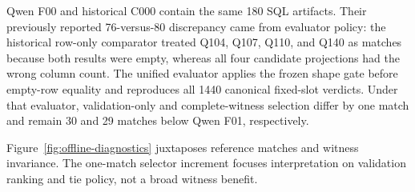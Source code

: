 \documentclass[information,article,submit,moreauthors]{Definitions/mdpi}
\begin{document}
\begin{table}[htbp]
\caption{Descriptive unified-evaluator comparison for the historical eight-slot pool. Differences and paired rescue/harm use C000 as baseline. C000 and Qwen F00 contain identical normalized SQL. All 180 questions are retained; no population or cross-template inference is attached to these counts. Historical question-level intervals and tests are preserved in Appendix~\ref{sec:historical-question-statistics}.}
\label{tab:offline}
\centering
\scriptsize
{}
\end{table}

Qwen F00 and historical C000 contain the same 180 SQL artifacts. Their previously reported 76-versus-80 discrepancy came from evaluator policy: the historical row-only comparator treated Q104, Q107, Q110, and Q140 as matches because both results were empty, whereas all four candidate projections had the wrong column count. The unified evaluator applies the frozen shape gate before empty-row equality and reproduces all 1440 canonical fixed-slot verdicts. Under that evaluator, validation-only and complete-witness selection differ by one match and remain 30 and 29 matches below Qwen F01, respectively.

Figure~\ref{fig:offline-diagnostics} juxtaposes reference matches and witness invariance. The one-match selector increment focuses interpretation on validation ranking and tie policy, not a broad witness benefit.
\end{document}
